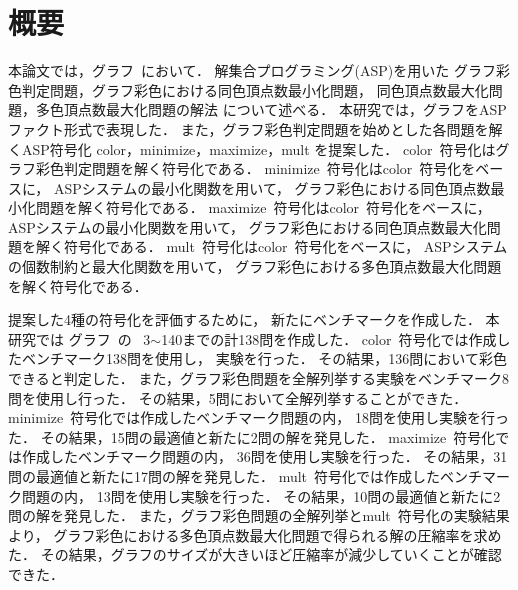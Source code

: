 \chapter*{概要}

本論文では，グラフ~\cite{Knuth:TAOCP:SAT}において．
解集合プログラミング(ASP)を用いた
グラフ彩色判定問題，グラフ彩色における同色頂点数最小化問題，
同色頂点数最大化問題，多色頂点数最大化問題の解法
について述べる．
本研究では，グラフをASPファクト形式で表現した．
また，グラフ彩色判定問題を始めとした各問題を解くASP符号化
\textsf{color}，\textsf{minimize}，\textsf{maximize}，\textsf{mult}
を提案した．
\textsf{color}~符号化はグラフ彩色判定問題を解く符号化である．
\textsf{minimize}~符号化は\textsf{color}~符号化をベースに，
ASPシステムの最小化関数を用いて，
グラフ彩色における同色頂点数最小化問題を解く符号化である．
\textsf{maximize}~符号化は\textsf{color}~符号化をベースに，
ASPシステムの最小化関数を用いて，
グラフ彩色における同色頂点数最大化問題を解く符号化である．
\textsf{mult}~符号化は\textsf{color}~符号化をベースに，
ASPシステムの個数制約と最大化関数を用いて，
グラフ彩色における多色頂点数最大化問題を解く符号化である．

提案した4種の符号化を評価するために，
新たにベンチマークを作成した．
本研究では
グラフ~\cite{Knuth:TAOCP:SAT}の
~3$\sim$140までの計138問を作成した．
\textsf{color}~符号化では作成したベンチマーク138問を使用し，
実験を行った．
その結果，136問において彩色できると判定した．
また，グラフ彩色問題を全解列挙する実験をベンチマーク8問を使用し行った．
その結果，5問において全解列挙することができた．
\textsf{minimize}~符号化では作成したベンチマーク問題の内，
18問を使用し実験を行った．
その結果，15問の最適値と新たに2問の解を発見した．
\textsf{maximize}~符号化では作成したベンチマーク問題の内，
36問を使用し実験を行った．
その結果，31問の最適値と新たに17問の解を発見した．
\textsf{mult}~符号化では作成したベンチマーク問題の内，
13問を使用し実験を行った．
その結果，10問の最適値と新たに2問の解を発見した．
また，グラフ彩色問題の全解列挙と\textsf{mult}~符号化の実験結果より，
グラフ彩色における多色頂点数最大化問題で得られる解の圧縮率を求めた．
その結果，グラフのサイズが大きいほど圧縮率が減少していくことが確認できた．


